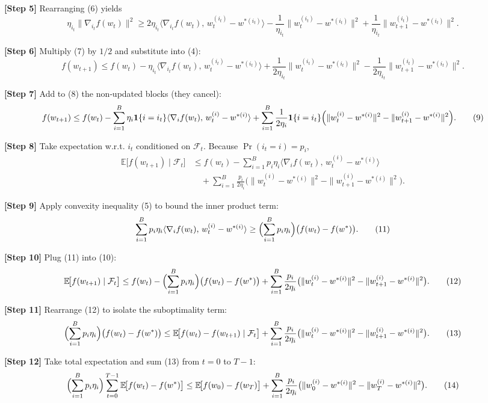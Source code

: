 \documentclass{article}
\newcommand{\E}{\mathbb{E}}
\begin{document}
\noindent\textbf{[Step 5]}  Rearranging (6) yields
\[
\eta_{i_t}\|\nabla_{i_t}f(w_t)\|^{2}
\ge
2\eta_{i_t}\langle \nabla_{i_t}f(w_t),\,w_t^{(i_t)}-w^{*(i_t)}\rangle
-\frac{1}{\eta_{i_t}}\|w_t^{(i_t)}-w^{*(i_t)}\|^{2}
+\frac{1}{\eta_{i_t}}\|w_{t+1}^{(i_t)}-w^{*(i_t)}\|^{2}.
\tag{7}
\]

\noindent\textbf{[Step 6]}  Multiply (7) by $1/2$ and substitute into (4):
\[
f(w_{t+1})\le f(w_t)-\eta_{i_t}\langle \nabla_{i_t}f(w_t),
\,w_t^{(i_t)}-w^{*(i_t)}\rangle
+\frac{1}{2\eta_{i_t}}\|w_t^{(i_t)}-w^{*(i_t)}\|^{2}
-\frac{1}{2\eta_{i_t}}\|w_{t+1}^{(i_t)}-w^{*(i_t)}\|^{2}.
\tag{8}
\]

\noindent\textbf{[Step 7]}  Add to (8) the non‑updated blocks (they cancel):
\[
f(w_{t+1})\le f(w_t)-\sum_{i=1}^{B}\eta_i \mathbf{1}\{i=i_t\}
\langle \nabla_i f(w_t),\,w_t^{(i)}-w^{*(i)}\rangle
+\sum_{i=1}^{B}\frac{1}{2\eta_i}\mathbf{1}\{i=i_t\}
\Bigl(\|w_t^{(i)}-w^{*(i)}\|^{2}
-\|w_{t+1}^{(i)}-w^{*(i)}\|^{2}\Bigr).
\tag{9}
\]

\noindent\textbf{[Step 8]}  Take expectation w.r.t. $i_t$ conditioned on $\mathcal{F}_t$.
Because $\Pr(i_t=i)=p_i$,
\[
\begin{aligned}
\E\!\bigl[f(w_{t+1})\mid\mathcal{F}_t\bigr]
&\le f(w_t)-\sum_{i=1}^{B}p_i\eta_i
\langle \nabla_i f(w_t),\,w_t^{(i)}-w^{*(i)}\rangle\\
&\quad+\sum_{i=1}^{B}\frac{p_i}{2\eta_i}
\bigl(\|w_t^{(i)}-w^{*(i)}\|^{2}
-\|w_{t+1}^{(i)}-w^{*(i)}\|^{2}\bigr).
\end{aligned}
\tag{10}
\]

\noindent\textbf{[Step 9]}  Apply convexity inequality (5) to bound the inner
product term:
\[
\sum_{i=1}^{B}p_i\eta_i
\langle \nabla_i f(w_t),\,w_t^{(i)}-w^{*(i)}\rangle
\ge \Bigl(\sum_{i=1}^{B}p_i\eta_i\Bigr)\bigl(f(w_t)-f(w^{*})\bigr).
\tag{11}
\]

\noindent\textbf{[Step 10]}  Plug (11) into (10):
\[
\E\!\bigl[f(w_{t+1})\mid\mathcal{F}_t\bigr]
\le f(w_t)-\Bigl(\sum_{i=1}^{B}p_i\eta_i\Bigr)
\bigl(f(w_t)-f(w^{*})\bigr)
+\sum_{i=1}^{B}\frac{p_i}{2\eta_i}
\bigl(\|w_t^{(i)}-w^{*(i)}\|^{2}
-\|w_{t+1}^{(i)}-w^{*(i)}\|^{2}\bigr).
\tag{12}
\]

\noindent\textbf{[Step 11]}  Rearrange (12) to isolate the suboptimality term:
\[
\Bigl(\sum_{i=1}^{B}p_i\eta_i\Bigr)
\bigl(f(w_t)-f(w^{*})\bigr)
\le
\E\!\bigl[f(w_t)-f(w_{t+1})\mid\mathcal{F}_t\bigr]
+\sum_{i=1}^{B}\frac{p_i}{2\eta_i}
\bigl(\|w_t^{(i)}-w^{*(i)}\|^{2}
-\|w_{t+1}^{(i)}-w^{*(i)}\|^{2}\bigr).
\tag{13}
\]

\noindent\textbf{[Step 12]}  Take total expectation and sum (13) from $t=0$ to
$T-1$:
\[
\Bigl(\sum_{i=1}^{B}p_i\eta_i\Bigr)
\sum_{t=0}^{T-1}\E\!\bigl[f(w_t)-f(w^{*})\bigr]
\le
\E\!\bigl[f(w_0)-f(w_T)\bigr]
+\sum_{i=1}^{B}\frac{p_i}{2\eta_i}
\bigl(\|w_0^{(i)}-w^{*(i)}\|^{2}
-\|w_T^{(i)}-w^{*(i)}\|^{2}\bigr).
\tag{14}
\]
\end{document}

